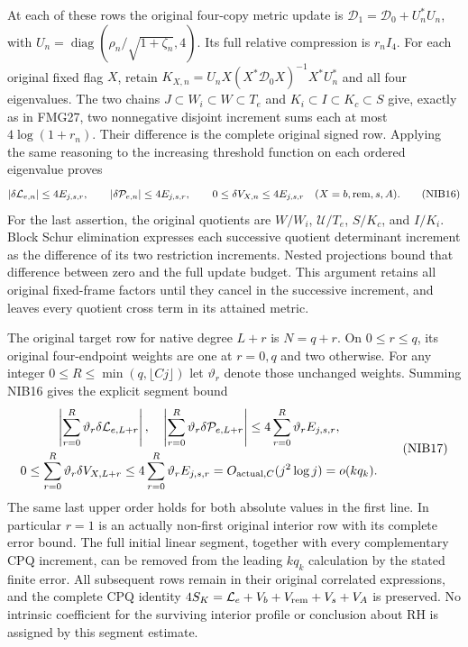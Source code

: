\documentclass[11pt,a4paper]{article}
\begin{document}
At each of these rows the original four-copy metric update is
$\mathcal D_1=\mathcal D_0+U_n^*U_n$, with
$U_n=\operatorname{diag}(\rho_n/\sqrt{1+\zeta_n},4)$.
Its full relative compression is $r_nI_4$. For each original
fixed flag $X$, retain $K_{X,n}=U_nX(X^*\mathcal D_0X)^{-1}X^*U_n^*$
and all four eigenvalues. The two chains
$J\subset W_i\subset W\subset T_e$ and
$K_i\subset I\subset K_c\subset S$ give, exactly as in FMG27,
two nonnegative disjoint increment sums each at most
$4\log(1+r_n)$. Their difference is the complete original signed
row. Applying the same reasoning to the increasing threshold
function on each ordered eigenvalue proves
\[
 |\delta\mathcal L_{e,n}|\le4E_{j,s,r},\qquad
 |\delta\mathcal P_{e,n}|\le4E_{j,s,r},\qquad
 0\le\delta V_{X,n}\le4E_{j,s,r}
                       \quad(X=b,{\rm rem},s,A).          \tag{NIB16}
\]
For the last assertion, the original quotients are $W/W_i$,
$\mathcal U/T_e$, $S/K_c$, and $I/K_i$. Block Schur elimination
expresses each successive quotient determinant increment as the
difference of its two restriction increments. Nested projections
bound that difference between zero and the full update budget.
This argument retains all original fixed-frame factors until they
cancel in the successive increment, and leaves every quotient
cross term in its attained metric.

The original target row for native degree $L+r$ is $N=q+r$.
On $0\le r\le q$, its original four-endpoint weights are one
at $r=0,q$ and two otherwise. For any integer
$0\le R\le\min(q,\lfloor Cj\rfloor)$ let $\vartheta_r$
denote those unchanged weights. Summing NIB16 gives the explicit
segment bound
\[
\begin{gathered}
 \left|\sum_{r=0}^{R}\vartheta_r\delta\mathcal L_{e,L+r}\right|,
 \quad
 \left|\sum_{r=0}^{R}\vartheta_r\delta\mathcal P_{e,L+r}\right|
       \le4\sum_{r=0}^{R}\vartheta_rE_{j,s,r},\\
 0\le\sum_{r=0}^{R}\vartheta_r\delta V_{X,L+r}
       \le4\sum_{r=0}^{R}\vartheta_rE_{j,s,r}
       =O_{{\rm actual},C}(j^2\log j)=o(kq_k).
\end{gathered}                                                     \tag{NIB17}
\]
The same last upper order holds for both absolute values in the
first line. In particular $r=1$ is an actually non-first original
interior row with its complete error bound. The full initial
linear segment, together with every complementary CPQ increment,
can be removed from the leading $kq_k$ calculation by the stated
finite error. All subsequent rows remain in their original
correlated expressions, and the complete CPQ identity
$4S_K=\mathcal L_e+V_b+V_{\rm rem}+V_s+V_A$ is preserved.
No intrinsic coefficient for the surviving interior profile or
conclusion about RH is assigned by this segment estimate.
\end{document}
